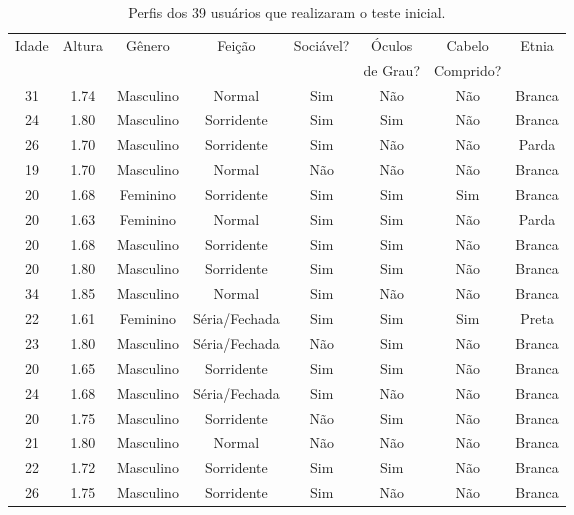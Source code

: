 \begin{table}[!ht]
	\caption{Perfis dos 39 usuários que realizaram o teste inicial.}
	\label{tab:perfilamostra}
	\centering
	\begin{tabular}{c | c | c | c | c | c | c | c}
        \hline
        Idade & Altura & Gênero & Feição & Sociável? & Óculos & Cabelo & Etnia \\
         &  &  &  &  & de Grau? & Comprido? &  \\
        \hline
        31 & 1.74 & Masculino & Normal & Sim & Não & Não & Branca \\
        \hline
        24 & 1.80 & Masculino & Sorridente & Sim & Sim & Não & Branca \\
        \hline
        26 & 1.70 & Masculino & Sorridente & Sim & Não & Não & Parda \\
        \hline
        19 & 1.70 & Masculino & Normal & Não & Não & Não & Branca \\
        \hline
        20 & 1.68 & Feminino & Sorridente & Sim & Sim & Sim & Branca \\
        \hline
        20 & 1.63 & Feminino & Normal & Sim & Sim & Não & Parda \\
        \hline
        20 & 1.68 & Masculino & Sorridente & Sim & Sim & Não & Branca \\
        \hline
        20 & 1.80 & Masculino & Sorridente & Sim & Sim & Não & Branca \\
        \hline
        34 & 1.85 & Masculino & Normal & Sim & Não & Não & Branca \\
        \hline
        22 & 1.61 & Feminino & Séria/Fechada & Sim & Sim & Sim & Preta \\
        \hline
        23 & 1.80 & Masculino & Séria/Fechada & Não & Sim & Não & Branca \\
        \hline
        20 & 1.65 & Masculino & Sorridente & Sim & Sim & Não & Branca \\
        \hline
        24 & 1.68 & Masculino & Séria/Fechada & Sim & Não & Não & Branca \\
        \hline
        20 & 1.75 & Masculino & Sorridente & Não & Sim & Não & Branca \\
        \hline
        21 & 1.80 & Masculino & Normal & Não & Não & Não & Branca \\
        \hline
        22 & 1.72 & Masculino & Sorridente & Sim & Sim & Não & Branca \\
        \hline
        26 & 1.75 & Masculino & Sorridente & Sim & Não & Não & Branca \\

\end{tabular}
\end{table}
